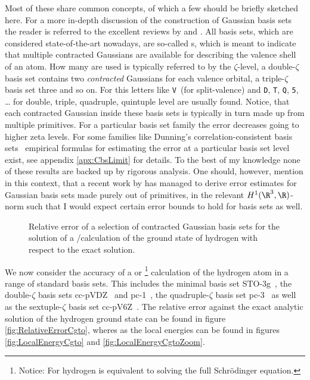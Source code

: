 Most of these share common concepts,
of which a few should be briefly sketched here.
For a more in-depth discussion of the construction of Gaussian basis sets
the reader is referred to the excellent reviews by \citet{Hill2013}
and \citet{Jensen2013}.
All basis sets, which are considered state-of-the-art nowadays,
are so-called s,
which is meant to indicate that multiple contracted Gaussians are available
for describing the valence shell of an atom.
How many are used is typically referred to by the $\zeta$-level,
\eg a double-$\zeta$ basis set contains two \emph{contracted} Gaussians
for each valence orbital,
a triple-$\zeta$ basis set three and so on.
For this letters like \texttt{V}~(for split-valence)
and \texttt{D}, \texttt{T}, \texttt{Q}, \texttt{5}, \ldots
for double, triple, quadruple, quintuple level are usually found.
Notice, that each contracted Gaussian inside these basis sets
is typically in turn made up from multiple primitives.
For a particular basis set family the error decreases going to higher
zeta levels.
For some families like Dunning's correlation-consistent
basis sets~\cite{Dunning1989,Jensen2005}
empirical formulas for estimating the error at a particular basis set
level exist, see appendix \vref{apx:CbsLimit} for details.
To the best of my knowledge none of these results are
backed up by rigorous analysis.
One should, however, mention in this context,
that a recent work by \citet{Bachmayr2014}
has managed to derive error estimates
for Gaussian basis sets made purely out of primitives,
in the relevant $H^1(\R^3,\R)$-norm
such that I would expect certain error bounds
to hold for {\cGTO} basis sets as well.

%
%

\begin{figure}
	\centering
	\caption{Relative error of a selection of
		contracted Gaussian basis sets for
		the solution of a \HF/\FCI calculation
		of the ground state of hydrogen
		with respect to the exact solution.
	}
	\label{fig:RelativeErrorCgto}
\end{figure}
We now consider the accuracy of a \HF or \FCI%
\footnote{Notice: For hydrogen \HF is equivalent to solving the full Schrödinger equation.}
calculation of the hydrogen atom in a range of standard \cGTO basis sets.
This includes the minimal basis set STO-3g~\cite{Hehre1969},
the double-$\zeta$ basis sets cc-pVDZ~\cite{Dunning1989}
and pc-1~\cite{Jensen2001},
the quadruple-$\zeta$ basis set pc-3~\cite{Jensen2001}
as well as the sextuple-$\zeta$ basis set cc-pV6Z~\cite{Wilson1996}.
The relative error against the exact analytic solution
of the hydrogen ground state can be found in figure \vref{fig:RelativeErrorCgto},
wheres as the local energies can be found in figures \vref{fig:LocalEnergyCgto}
and \vref{fig:LocalEnergyCgtoZoom}.

